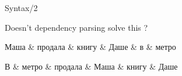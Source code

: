 \documentclass[10pt, compress]{beamer}
\begin{document}
\begin{frame}{Syntax/2}

Doesn't dependency parsing solve this ? 

\begin{center}

    \begin{dependency}
      \begin{deptext}[column sep=1mm,column 1/.style={anchor=base west}]
			Маша \& продала \& книгу \& Даше \& в \& метро \\  
        \end{deptext}
    \end{dependency}

    \begin{dependency}
      \begin{deptext}[column sep=1mm,column 1/.style={anchor=base west}]
			В \& метро \& продала \& Маша \& книгу \& Даше \\
        \end{deptext}
    \end{dependency}

\end{center}


\end{frame}
\end{document}
